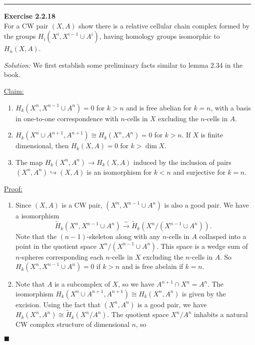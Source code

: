 \documentclass[a4paper, 12pt]{article}
\newenvironment{problem}[2][Exercise]
    { \begin{mdframed}[backgroundcolor=gray!20] \textbf{#1 #2} \\}
    {  \end{mdframed}}
\newenvironment{solution}
    {\textit{Solution:}}
    {}
\newenvironment{claim}[1]{\par\noindent\underline{Claim:}\space#1}{}
\newenvironment{claimproof}[1]{\par\noindent\underline{Proof:}\space#1}{\hfill $\blacksquare$}
\begin{document}
\noindent\rule{7in}{2.8pt}
\begin{problem}{2.2.18}
For a CW pair \((X,A)\) show there is a relative cellular chain complex formed by the groups \(H_i(X^i,X^{i-1}\cup A^i)\), having homology groups isomorphic to \(H_n(X,A)\).
\end{problem}
\begin{solution}
We first establish some preliminary facts similar to lemma 2.34 in the book.
\begin{claim}
\begin{enumerate}[(1)]
\item \(H_k(X^n,X^{n-1}\cup A^n)=0\) for \(k>n\) and is free abelian for \(k=n\), with a basis in one-to-one correspondence with \(n\)-cells in \(X\) excluding the \(n\)-cells in \(A\). 
\item \(H_k(X^n\cup A^{n+1},A^{n+1})\cong H_k(X^n,A^n)=0\) for \(k>n\). If \(X\) is finite dimensional, then \(H_k(X,A)=0\) for \(k>\dim X\).
\item The map \(H_k(X^n,A^n)\rightarrow H_k(X,A)\) induced by the inclusion of pairs \((X^n,A^n)\hookrightarrow (X,A)\) is an isomorphism for \(k<n\) and surjective for \(k=n\).
\end{enumerate}
\end{claim}
\begin{claimproof}
\begin{enumerate}[(1)]
\item Since \((X,A)\) is a CW pair, \((X^n,X^{n-1}\cup A^n)\) is also a good pair. We have a isomorphism 
\[\tilde{H}_k(X^n,X^{n-1}\cup A^n)\xrightarrow{\sim} \tilde{H}_k(X^n/(X^{n-1}\cup A^n)).\]
Note that the \((n-1)\)-skeleton along with any \(n\)-cells in \(A\) collasped into a point in the quotient space \(X^n/(X^{n-1}\cup A^n)\). This space is a wedge sum of \(n\)-spheres corresponding each 
\(n\)-cells in \(X\) excluding the \(n\)-cells in \(A\). So \(H_k(X^n,X^{n-1}\cup A^n)=0\) if \(k>n\) and is free abelain if \(k=n\).
\item Note that \(A\) is a subcomplex of \(X\), so we have \(A^{n+1}\cap X^n=A^n\). The isomorphism \(H_k(X^n\cup A^{n+1},A^{n+1})\cong H_k(X^n,A^n)\) is given by the excision. Using the fact that \((X^n,A^n)\) is a good pair, 
we have \(H_k(X^n,A^n)\cong \tilde{H}_k(X^n/A^n)\). The quotient space \(X^n/A^n\) inhabits a natural CW complex structure of dimensional \(n\), so 

\end{enumerate}
\end{claimproof}
\end{solution}
\end{document}

